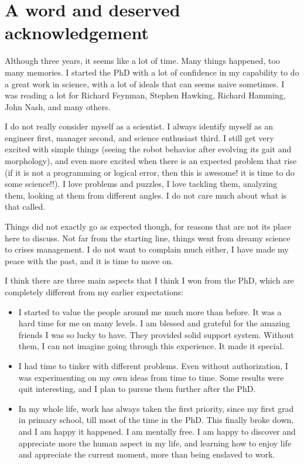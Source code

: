 \chapter*{A word and deserved acknowledgement}
\par Although three years, it seems like a lot of time. Many things happened, too many memories. I started the PhD with a lot of confidence in my capability to do a great work in science, with a lot of ideals that can seems naive sometimes. I was reading a lot for Richard Feynman, Stephen Hawking, Richard Hamming, John Nash, and many others.

\par I do not really consider myself as a scientist. I always identify myself as an engineer first, manager second, and science enthusiast third. I still get very excited with simple things (seeing the robot behavior after evolving its gait and morphology), and even more excited when there is an expected problem that rise (if it is not a programming or logical error, then this is awesome! it is time to do some science!!). I love problems and puzzles, I love tackling them, analyzing them, looking at them from different angles. I do not care much about what is that called.

\par Things did not exactly go as expected though, for reasons that are not its place here to discuss. Not far from the starting line, things went from dreamy science to crises management. I do not want to complain much either, I have made my peace with the past, and it is time to move on.

\par I think there are three main aspects that I think I won from the PhD, which are completely different from my earlier expectations:
\begin{itemize}
  \item I started to value the people around me much more than before. It was a hard time for me on many levels. I am blessed and grateful for the amazing friends I was so lucky to have. They provided solid support system. Without them, I can not imagine going through this experience. It made it special.
  \item I had time to tinker with different problems. Even without authorization, I was experimenting on my own ideas from time to time. Some results were quit interesting, and I plan to pursue them further after the PhD.
  \item In my whole life, work has always taken the first priority, since my first grad in primary school, till most of the time in the PhD. This finally broke down, and I am happy it happened. I am mentally free. I am happy to discover and appreciate more the human aspect in my life, and learning how to enjoy life and appreciate the current moment, more than being enslaved to work.
\end{itemize}

